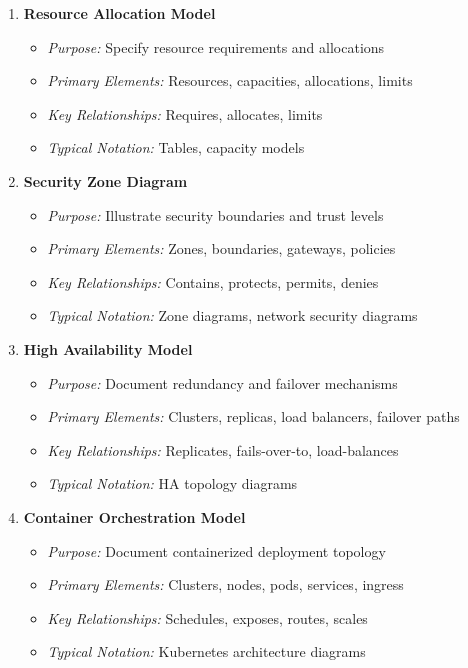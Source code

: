 \documentclass[11pt,letterpaper]{article}
\begin{document}
\begin{enumerate}[label=\textbf{MT\arabic*:}, leftmargin=2.5em]
    \item \textbf{Resource Allocation Model}
    \begin{itemize}[nosep]
        \item \textit{Purpose:} Specify resource requirements and allocations
        \item \textit{Primary Elements:} Resources, capacities, allocations, limits
        \item \textit{Key Relationships:} Requires, allocates, limits
        \item \textit{Typical Notation:} Tables, capacity models
    \end{itemize}
    
    \item \textbf{Security Zone Diagram}
    \begin{itemize}[nosep]
        \item \textit{Purpose:} Illustrate security boundaries and trust levels
        \item \textit{Primary Elements:} Zones, boundaries, gateways, policies
        \item \textit{Key Relationships:} Contains, protects, permits, denies
        \item \textit{Typical Notation:} Zone diagrams, network security diagrams
    \end{itemize}
    
    \item \textbf{High Availability Model}
    \begin{itemize}[nosep]
        \item \textit{Purpose:} Document redundancy and failover mechanisms
        \item \textit{Primary Elements:} Clusters, replicas, load balancers, failover paths
        \item \textit{Key Relationships:} Replicates, fails-over-to, load-balances
        \item \textit{Typical Notation:} HA topology diagrams
    \end{itemize}
    
    \item \textbf{Container Orchestration Model}
    \begin{itemize}[nosep]
        \item \textit{Purpose:} Document containerized deployment topology
        \item \textit{Primary Elements:} Clusters, nodes, pods, services, ingress
        \item \textit{Key Relationships:} Schedules, exposes, routes, scales
        \item \textit{Typical Notation:} Kubernetes architecture diagrams
    \end{itemize}
\end{enumerate}
\end{document}

